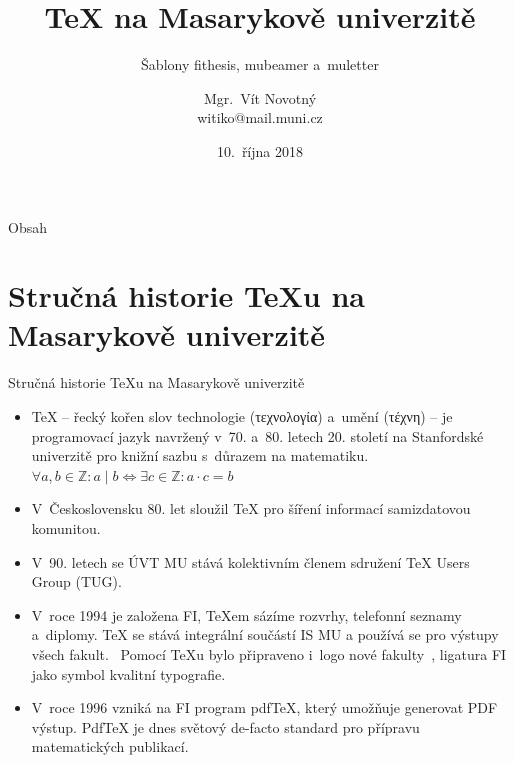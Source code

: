 \documentclass[
  aspectratio=169,
]{beamer}
\begin{document}
\title[\TeX{} na MU]{\TeX{} na Masarykově univerzitě}
\subtitle{Šablony fithesis, mubeamer a~muletter}
\author[V.\,Novotný]{Mgr.\ Vít Novotný \\ witiko@mail.muni.cz}
\date{10.\ října 2018}
\subject{TeX na Masarykově univerzitě}

\begin{frame}[plain]
\maketitle
\end{frame}

\begin{frame}{Obsah}
\tableofcontents
\end{frame}

\section[Stručná historie \TeX u na MU]{Stručná historie \TeX u na Masarykově univerzitě}

\begin{frame}{Stručná historie \TeX u na Masarykově univerzitě}
\begin{itemize}
\item \TeX{} -- řecký kořen slov \alert{technologie} (\textgreek{τεχνολογία}) a~\alert{umění} (\textgreek{τέχνη}) -- je \alert{programovací jazyk} navržený v~70. a~80. letech 20. století na Stanfordské univerzitě \alert{pro knižní sazbu s~důrazem na matematiku}. $\forall a,b\in\mathbb{Z}: a\mid b\iff\exists c\in\mathbb{Z}:a\cdot c=b$
\item V~Československu 80. let sloužil \TeX{} pro šíření informací samizdatovou komunitou.
\item V~90. letech se ÚVT MU stává kolektivním členem sdružení \TeX{} Users Group (TUG).
\item V~roce 1994 je založena FI, \alert{\TeX em sázíme rozvrhy, telefonní seznamy a~diplomy}. \TeX{} se stává \alert{integrální součástí IS MU} a používá se pro výstupy všech fakult.~\cite{sojkanovotny17} Pomocí \TeX u bylo připraveno i~logo nové fakulty~\cite{zlatuska95}, ligatura FI jako symbol kvalitní typografie. 
\item V~roce 1996 vzniká na FI program pdf\TeX{}, který umožňuje generovat PDF výstup. Pdf\TeX{} je dnes \alert{světový de-facto standard pro přípravu matematických publikací}.
\end{itemize}
\end{frame}
\end{document}
